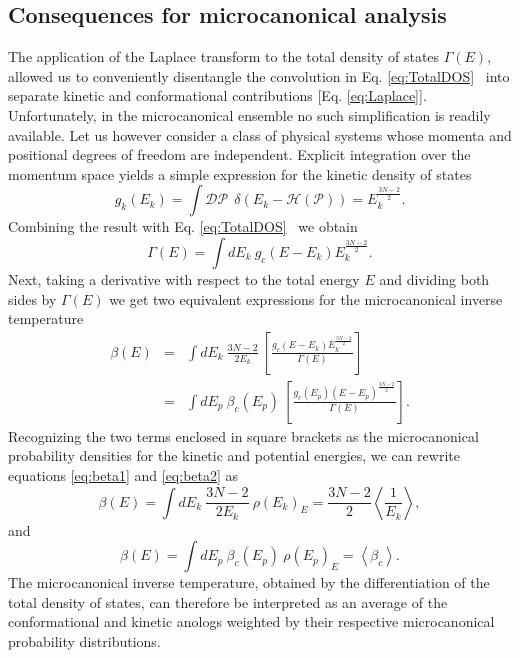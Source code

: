 \documentclass[12pt]{report}
\begin{document}
\subsection{Consequences for microcanonical analysis}
The application of the Laplace transform to the total density of states $\Gamma (E)$, allowed us to conveniently disentangle the convolution in Eq.\,\,\ref{eq:TotalDOS} \, into separate kinetic and conformational contributions [Eq. \ref{eq:Laplace}]. Unfortunately, in the microcanonical ensemble no such simplification is readily available. Let us however consider a class of physical systems whose momenta and positional degrees of freedom are independent. Explicit integration over the momentum space yields a simple expression for the kinetic density of states
\begin{equation}
g_{k}(E_{k}) = \int \mathcal{DP} \:\: \delta(E_{k} - \mathcal{H}(\mathcal{P})) 
			 = E_{k}^{\frac{3N-2}{2}}.
\end{equation}
Combining the result with Eq. \ref{eq:TotalDOS} \, we obtain
\begin{equation}
\Gamma(E) = \int dE_{k} \: g_{c}(E - E_{k})E_{k}^{\frac{3N-2}{2}}.
\end{equation}
Next, taking a derivative with respect to the total energy $E$ and dividing both sides by $\Gamma(E)$ we get two equivalent expressions for the microcanonical inverse temperature 
\begin{eqnarray}
\beta(E) &=& \int dE_{k} \:\frac{3N-2}{2E_{k}} \:\left[\frac{g_{c}(E - E_{k})E_{k}^{\frac{3N-2}{2}}}{\Gamma (E)}\right]
\label{eq:beta1}  \\
		&=& \int dE_{p} \: \beta_{c}(E_{p})\: \left[ \frac{g_{c}(E_{p})(E- E_{p})^{\frac{3N-2}{2}}}{\Gamma (E)} \right]
\label{eq:beta2}.  
\end{eqnarray}
Recognizing the two terms enclosed in square brackets as the microcanonical probability densities for the kinetic and potential energies,
we can rewrite equations \ref{eq:beta1} and \ref{eq:beta2} as
\newpage
\noindent
\begin{equation}
\label{eq:beta3}
\beta(E) = \int dE_{k} \:\frac{3N-2}{2E_{k}} \: \rho(E_{k})_{E} = \frac{3N-2}{2}\left\langle \frac{1}{E_{k}}  \right\rangle,
\end{equation}
and 
\begin{equation}
\label{eq:beta4}
\beta(E) = \int dE_{p} \: \beta_{c}(E_{p})\: \rho(E_{p})_{E} = \left\langle \beta_{c} \right\rangle.
\end{equation}
The microcanonical inverse temperature, obtained by the differentiation of the total density of states, can therefore be interpreted as an average of the conformational and kinetic anologs weighted by their respective microcanonical probability distributions.
\end{document}
